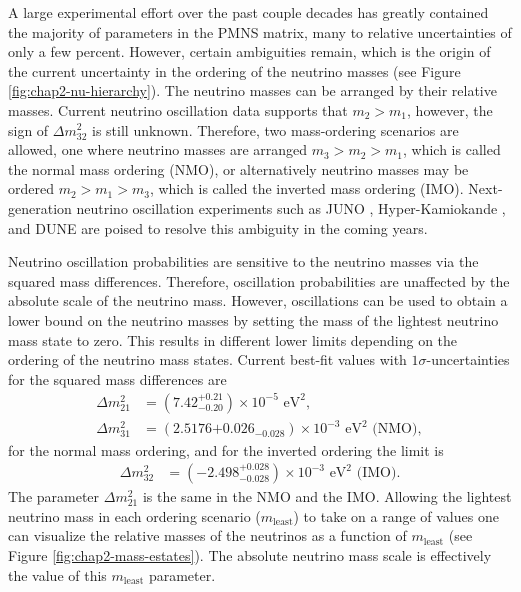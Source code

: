 A large experimental effort over the past couple decades has greatly contained the majority of parameters in the PMNS matrix, many to relative uncertainties of only a few percent. However, certain ambiguities remain, which is the origin of the current uncertainty in the ordering of the neutrino masses (see Figure \ref{fig:chap2-nu-hierarchy}). The neutrino masses can be arranged by their relative masses. Current neutrino oscillation data supports that $m_2>m_1$, however, the sign of $\Delta m_{32}^2$ is still unknown. Therefore, two mass-ordering scenarios are allowed, one where neutrino masses are arranged $m_3>m_2>m_1$, which is called the normal mass ordering (NMO), or alternatively neutrino masses may be ordered $m_2>m_1>m_3$, which is called the inverted mass ordering (IMO). Next-generation neutrino oscillation experiments such as JUNO \cite{JUNO}, Hyper-Kamiokande \cite{hyperk}, and DUNE \cite{DUNE} are poised to resolve this ambiguity in the coming years.

Neutrino oscillation probabilities are sensitive to the neutrino masses via the squared mass differences. Therefore, oscillation probabilities are unaffected by the absolute scale of the neutrino mass. However, oscillations can be used to obtain a lower bound on the neutrino masses by setting the mass of the lightest neutrino mass state to zero. This results in different lower limits depending on the ordering of the neutrino mass states. Current best-fit values \cite{Workman:2022ynf} with $1\sigma$-uncertainties for the squared mass differences are 
\begin{align}
    \Delta m_{21}^2&=(7.42^{+0.21}_{-0.20})\times 10^{-5}\text{ eV}^2,\\
    \Delta m_{31}^2&=(2.5176{+0.026}_{-0.028})\times 10^{-3}\text{ eV}^2\text{ (NMO)},
\end{align}
for the normal mass ordering, and for the inverted ordering the limit is
\begin{align}
    \Delta m_{32}^2&=(-2.498^{+0.028}_{-0.028})\times 10^{-3}\text{ eV}^2\text{ (IMO)}.
\end{align}
The parameter $\Delta m_{21}^2$ is the same in the NMO and the IMO. Allowing the lightest neutrino mass in each ordering scenario ($m_\textrm{least}$) to take on a range of values one can visualize the relative masses of the neutrinos as a function of $m_\textrm{least}$ (see Figure \ref{fig:chap2-mass-estates}). The absolute neutrino mass scale is effectively the value of this $m_\textrm{least}$ parameter.


